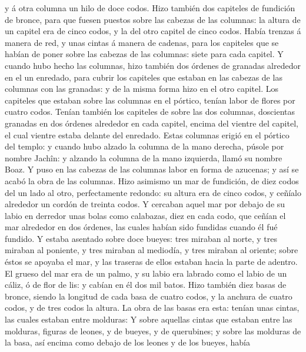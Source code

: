 y á otra columna un hilo de doce codos.  Hizo también dos
capiteles de fundición de bronce, para que fuesen puestos sobre las
cabezas de las columnas: la altura de un capitel era de cinco codos, y
la del otro capitel de cinco codos.  Había trenzas á
manera de red, y unas cintas á manera de cadenas, para los capiteles que
se habían de poner sobre las cabezas de las columnas: siete para cada
capitel.  Y cuando hubo hecho las columnas, hizo también
dos órdenes de granadas alrededor en el un enredado, para cubrir los
capiteles que estaban en las cabezas de las columnas con las granadas: y
de la misma forma hizo en el otro capitel.  Los capiteles
que estaban sobre las columnas en el pórtico, tenían labor de flores por
cuatro codos.  Tenían también los capiteles de sobre las
dos columnas, doscientas granadas en dos órdenes alrededor en cada
capitel, encima del vientre del capitel, el cual vientre estaba delante
del enredado.  Estas columnas erigió en el pórtico del
templo: y cuando hubo alzado la columna de la mano derecha, púsole por
nombre Jachîn: y alzando la columna de la mano izquierda, llamó su
nombre Boaz.  Y puso en las cabezas de las columnas labor
en forma de azucenas; y así se acabó la obra de las columnas.
 Hizo asimismo un mar de fundición, de diez codos del un
lado al otro, perfectamente redondo: su altura era de cinco codos, y
ceñíalo alrededor un cordón de treinta codos.  Y cercaban
aquel mar por debajo de su labio en derredor unas bolas como calabazas,
diez en cada codo, que ceñían el mar alrededor en dos órdenes, las
cuales habían sido fundidas cuando él fué fundido.  Y
estaba asentado sobre doce bueyes: tres miraban al norte, y tres miraban
al poniente, y tres miraban al mediodía, y tres miraban al oriente;
sobre éstos se apoyaba el mar, y las traseras de ellos estaban hacia la
parte de adentro.  El grueso del mar era de un palmo, y
su labio era labrado como el labio de un cáliz, ó de flor de lis: y
cabían en él dos mil batos.  Hizo también diez basas de
bronce, siendo la longitud de cada basa de cuatro codos, y la anchura de
cuatro codos, y de tres codos la altura.  La obra de las
basas era esta: tenían unas cintas, las cuales estaban entre molduras:
 Y sobre aquellas cintas que estaban entre las molduras,
figuras de leones, y de bueyes, y de querubines; y sobre las molduras de
la basa, así encima como debajo de los leones y de los bueyes, había

